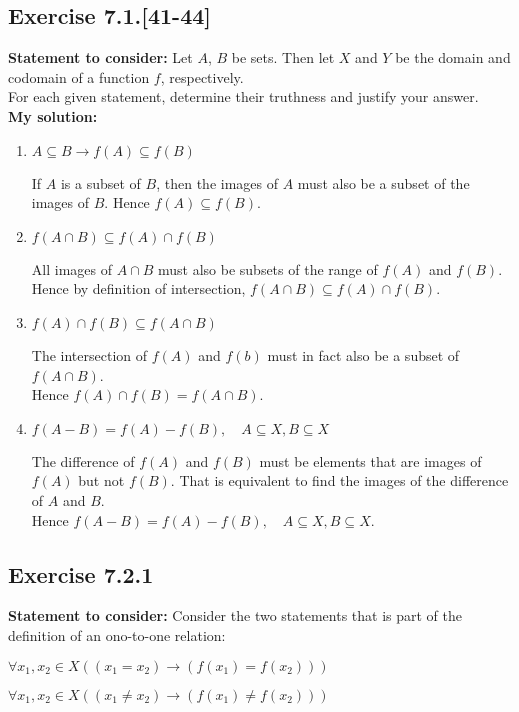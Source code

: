 \documentclass{article}
\newcommand{\cent}[1]{\begin{center}#1\end{center}}
\newcommand{\In}{\! \in \!}
\newcommand{\Remark}{\textbf{Statement to consider: }}
\newcommand{\Solution}{\textbf{My solution: }}
\newcommand{\Exercise}[1]{\subsection*{Exercise #1}}
\begin{document}
 	\Exercise{7.1.[41-44]}
 	
 	\Remark
 	Let $A$, $B$ be sets. Then let $X$ and $Y$ be the domain and codomain of a function $f$, respectively.\\
 	
 	For each given statement, determine their truthness and justify your answer.\\
 	
 	\Solution
 	\begin{enumerate}[label=\textbf{\alph*.}]
 		\item $A\subseteq B \to f(A) \subseteq f(B)$
 		
 		If $A$ is a subset of $B$, then the images of $A$ must also be a subset of the images of $B$. Hence $f(A) \subseteq f(B)$.
 		
 		\item $f(A \cap B) \subseteq f(A) \cap f(B)$
 		
 		All images of $A \cap B$ must also be subsets of the range of $f(A)$ and $f(B)$.\\ 
 		
 		Hence by definition of intersection, $f(A \cap B) \subseteq f(A) \cap f(B)$.\\
 		\item $f(A) \cap f(B) \subseteq f(A \cap B)$
 		
 		The intersection of $f(A)$ and $f(b)$ must in fact also be a subset of $f(A \cap B)$.\\
 		
 		Hence $f(A) \cap f(B) = f(A \cap B)$.
 		
 		\item $ f(A-B) = f(A) - f(B), \quad A \subseteq X, B \subseteq X $
 		
 		The difference of $ f(A) $ and $f(B)$ must be elements that are images of $f(A)$ but not $f(B)$. That is equivalent to find the images of the difference of $A$ and $B$.\\ 
 		
 		Hence  $ f(A-B) = f(A) - f(B), \quad A \subseteq X, B \subseteq X $.
 	\end{enumerate}
 	
 	\Exercise{7.2.1}
 	
 	\Remark
 	Consider the two statements that is part of the definition of an ono-to-one relation:
 	
 	\cent{$\forall x_1, x_2 \In X ((x_1 = x_2) \to (f(x_1) = f(x_2) ))$}
 	\cent{$\forall x_1, x_2 \In X ((x_1 \neq x_2) \to (f(x_1) \neq f(x_2)))$}
 	
\end{document}
